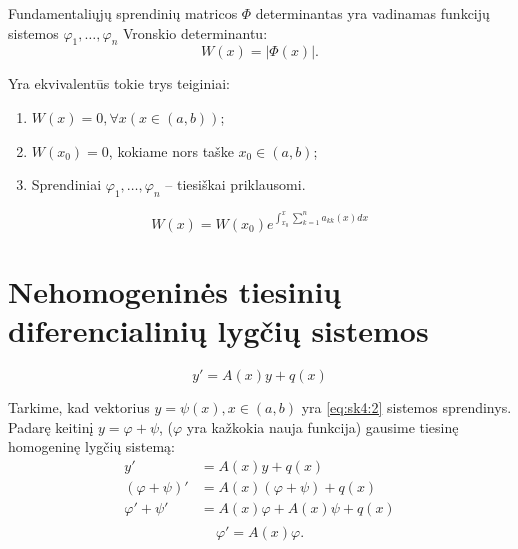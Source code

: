 \begin{defn}
  Fundamentaliųjų sprendinių matricos $\Phi$ determinantas yra
  vadinamas funkcijų sistemos $\varphi_{1}, \ldots, \varphi_{n}$
  Vronskio determinantu:
  \begin{equation*}
    W(x) = |\Phi(x)|.
  \end{equation*}
\end{defn}

\begin{prop}
  Yra ekvivalentūs tokie trys teiginiai:
  \begin{enumerate}
    \item $W(x) = 0, \forall x (x \in (a, b))$;
    \item $W(x_{0}) = 0$, kokiame nors taške $x_{0} \in (a, b)$;
    \item Sprendiniai $\varphi_{1}, \ldots, \varphi_{n}$ – tiesiškai
      priklausomi.
  \end{enumerate}
\end{prop}

\begin{defn}
  \begin{equation*}
    W(x) = W(x_{0})e^{\int _{x_{0}}^{x} \sum _{k=1}^{n}a_{kk}(x)dx}
  \end{equation*}
\end{defn}

\section{Nehomogeninės tiesinių diferencialinių lygčių sistemos}

\begin{equation}
  y' = A(x) y + q(x)
  \label{eq:sk4:2}
\end{equation}

Tarkime, kad vektorius $y = \psi(x), x \in (a, b)$ yra
\ref{eq:sk4:2} sistemos sprendinys. Padarę keitinį $y = \varphi + \psi$,
($\varphi$ yra kažkokia nauja funkcija) gausime tiesinę homogeninę
lygčių sistemą:
\begin{align*}
  y' &= A(x) y + q(x) \\
  (\varphi + \psi)' &= A(x)(\varphi + \psi) + q(x) \\
  \varphi' + \psi' &= A(x)\varphi + A(x)\psi + q(x) \\
\end{align*}
\begin{equation}
  \varphi' = A(x)\varphi.
  \label{eq:sk4:3}
\end{equation}

